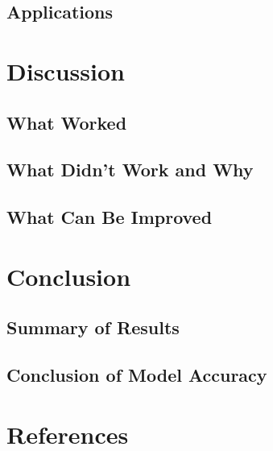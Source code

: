 \documentclass{article}
\begin{document}
\subsection{Applications}

\section{Discussion}
\subsection{What Worked}
\subsection{What Didn’t Work and Why}
\subsection{What Can Be Improved}

\section{Conclusion}
\subsection{Summary of Results}
\subsection{Conclusion of Model Accuracy}

\section{References}
\end{document}
